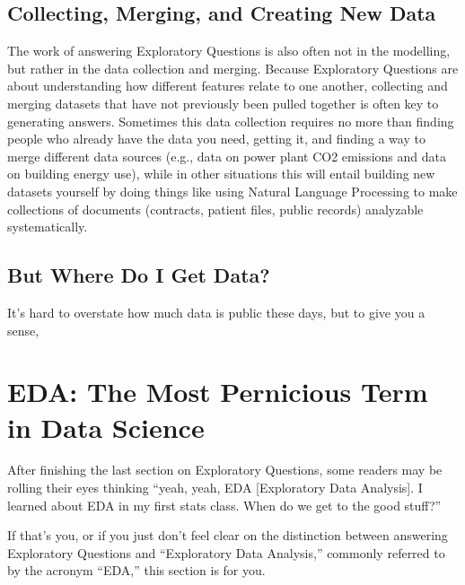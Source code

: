 \documentclass[letterpaper,10pt,english]{jupyterBook}
\begin{document}
\subsection{Collecting, Merging, and Creating New Data}
\label{\detokenize{30_questions/10_using_exploratory_questions:collecting-merging-and-creating-new-data}}
\sphinxAtStartPar
The work of answering Exploratory Questions is also often not in the modelling, but rather in the data collection and merging. Because Exploratory Questions are about understanding how different features relate to one another, collecting and merging datasets that have not previously been pulled together is often key to generating answers. Sometimes this data collection requires no more than finding people who already have the data you need, getting it, and finding a way to merge different data sources (e.g., data on power plant CO2 emissions and data on building energy use), while in other situations this will entail building new datasets yourself by doing things like using Natural Language Processing to make collections of documents (contracts, patient files, public records) analyzable systematically.


\subsection{But Where Do I Get Data?}
\label{\detokenize{30_questions/10_using_exploratory_questions:but-where-do-i-get-data}}
\sphinxAtStartPar
It’s hard to overstate how much data is public these days, but to give you a sense, 

\sphinxstepscope


\section{EDA: The Most Pernicious Term in Data Science}
\label{\detokenize{30_questions/07_eda:eda-the-most-pernicious-term-in-data-science}}\label{\detokenize{30_questions/07_eda::doc}}
\sphinxAtStartPar
After finishing the last section on Exploratory Questions, some readers may be rolling their eyes thinking “yeah, yeah, EDA {[}Exploratory Data Analysis{]}. I learned about EDA in my first stats class. When do we get to the good stuff?”

\sphinxAtStartPar
If that’s you, or if you just don’t feel clear on the distinction between answering Exploratory Questions and “Exploratory Data Analysis,” commonly referred to by the acronym “EDA,” this section is for you.
\end{document}
